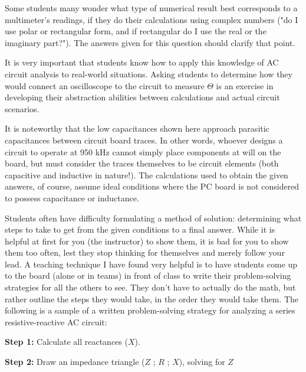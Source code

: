 





Some students many wonder what type of numerical result best corresponds to a multimeter's readings, if they do their calculations using complex numbers ("do I use polar or rectangular form, and if rectangular do I use the real or the imaginary part?").  The answers given for this question should clarify that point.

It is very important that students know how to apply this knowledge of AC circuit analysis to real-world situations.  Asking students to determine how they would connect an oscilloscope to the circuit to measure $\Theta$ is an exercise in developing their abstraction abilities between calculations and actual circuit scenarios.

It is noteworthy that the low capacitances shown here approach parasitic capacitances between circuit board traces.  In other words, whoever designs a circuit to operate at 950 kHz cannot simply place components at will on the board, but must consider the traces themselves to be circuit elements (both capacitive and inductive in nature!).  The calculations used to obtain the given answers, of course, assume ideal conditions where the PC board is not considered to possess capacitance or inductance.

\vskip 10pt

Students often have difficulty formulating a method of solution: determining what steps to take to get from the given conditions to a final answer.  While it is helpful at first for you (the instructor) to show them, it is bad for you to show them too often, lest they stop thinking for themselves and merely follow your lead.  A teaching technique I have found very helpful is to have students come up to the board (alone or in teams) in front of class to write their problem-solving strategies for all the others to see.  They don't have to actually do the math, but rather outline the steps they would take, in the order they would take them.  The following is a sample of a written problem-solving strategy for analyzing a series resistive-reactive AC circuit:

\vskip 10pt

\goodbreak

{\bf Step 1:} Calculate all reactances ($X$).

{\bf Step 2:} Draw an impedance triangle ($Z$ ; $R$ ; $X$), solving for $Z$

